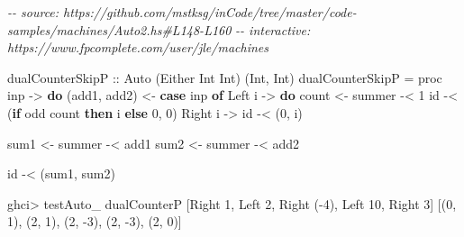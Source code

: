 \documentclass[]{article}
\newenvironment{Shaded}{}{}
\newcommand{\CommentTok}[1]{\textcolor[rgb]{0.38,0.63,0.69}{\textit{#1}}}
\newcommand{\DataTypeTok}[1]{\textcolor[rgb]{0.56,0.13,0.00}{#1}}
\newcommand{\DecValTok}[1]{\textcolor[rgb]{0.25,0.63,0.44}{#1}}
\newcommand{\FunctionTok}[1]{\textcolor[rgb]{0.02,0.16,0.49}{#1}}
\newcommand{\KeywordTok}[1]{\textcolor[rgb]{0.00,0.44,0.13}{\textbf{#1}}}
\newcommand{\NormalTok}[1]{#1}
\newcommand{\OperatorTok}[1]{\textcolor[rgb]{0.40,0.40,0.40}{#1}}
\newcommand{\OtherTok}[1]{\textcolor[rgb]{0.00,0.44,0.13}{#1}}
\begin{document}
\begin{Shaded}
\begin{Highlighting}[]
\CommentTok{{-}{-} source: https://github.com/mstksg/inCode/tree/master/code{-}samples/machines/Auto2.hs\#L148{-}L160}
\CommentTok{{-}{-} interactive: https://www.fpcomplete.com/user/jle/machines}

\OtherTok{dualCounterSkipP ::} \DataTypeTok{Auto}\NormalTok{ (}\DataTypeTok{Either} \DataTypeTok{Int} \DataTypeTok{Int}\NormalTok{) (}\DataTypeTok{Int}\NormalTok{, }\DataTypeTok{Int}\NormalTok{)}
\NormalTok{dualCounterSkipP }\OtherTok{=}\NormalTok{ proc inp }\OtherTok{{-}\textgreater{}} \KeywordTok{do}
\NormalTok{    (add1, add2) }\OtherTok{\textless{}{-}} \KeywordTok{case}\NormalTok{ inp }\KeywordTok{of}
                      \DataTypeTok{Left}\NormalTok{ i }\OtherTok{{-}\textgreater{}} \KeywordTok{do}
\NormalTok{                        count }\OtherTok{\textless{}{-}}\NormalTok{ summer }\OperatorTok{{-}\textless{}} \DecValTok{1}
                        \FunctionTok{id} \OperatorTok{{-}\textless{}}\NormalTok{ (}\KeywordTok{if} \FunctionTok{odd}\NormalTok{ count }\KeywordTok{then}\NormalTok{ i }\KeywordTok{else} \DecValTok{0}\NormalTok{, }\DecValTok{0}\NormalTok{)}
                      \DataTypeTok{Right}\NormalTok{ i }\OtherTok{{-}\textgreater{}}
                        \FunctionTok{id} \OperatorTok{{-}\textless{}}\NormalTok{ (}\DecValTok{0}\NormalTok{, i)}

\NormalTok{    sum1 }\OtherTok{\textless{}{-}}\NormalTok{ summer }\OperatorTok{{-}\textless{}}\NormalTok{ add1}
\NormalTok{    sum2 }\OtherTok{\textless{}{-}}\NormalTok{ summer }\OperatorTok{{-}\textless{}}\NormalTok{ add2}

    \FunctionTok{id} \OperatorTok{{-}\textless{}}\NormalTok{ (sum1, sum2)}
\end{Highlighting}
\end{Shaded}

\begin{Shaded}
\begin{Highlighting}[]
\NormalTok{ghci}\OperatorTok{\textgreater{}}\NormalTok{ testAuto\_ dualCounterP [}\DataTypeTok{Right} \DecValTok{1}\NormalTok{, }\DataTypeTok{Left} \DecValTok{2}\NormalTok{, }\DataTypeTok{Right}\NormalTok{ (}\OperatorTok{{-}}\DecValTok{4}\NormalTok{), }\DataTypeTok{Left} \DecValTok{10}\NormalTok{, }\DataTypeTok{Right} \DecValTok{3}\NormalTok{]}
\NormalTok{[(}\DecValTok{0}\NormalTok{, }\DecValTok{1}\NormalTok{), (}\DecValTok{2}\NormalTok{, }\DecValTok{1}\NormalTok{), (}\DecValTok{2}\NormalTok{, }\OperatorTok{{-}}\DecValTok{3}\NormalTok{), (}\DecValTok{2}\NormalTok{, }\OperatorTok{{-}}\DecValTok{3}\NormalTok{), (}\DecValTok{2}\NormalTok{, }\DecValTok{0}\NormalTok{)]}
\end{Highlighting}
\end{Shaded}
\end{document}
